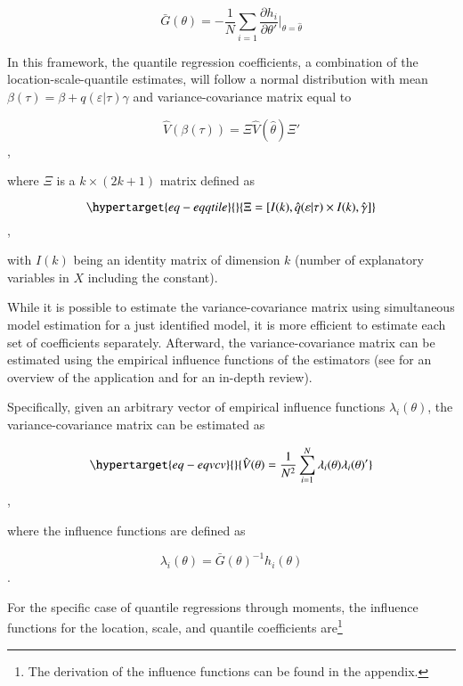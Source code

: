 \documentclass[
  authoryear,
  review,
  1p]{elsarticle}
\begin{document}
\[\bar{G}(\theta) =-\frac{1}{N} \sum_{i=1} \frac{\partial h_i}{\partial \theta'} \Big|_{\theta=\hat\theta}\]

In this framework, the quantile regression coefficients, a combination
of the location-scale-quantile estimates, will follow a normal
distribution with mean \(\beta(\tau) = \beta+q(\varepsilon|\tau)\gamma\)
and variance-covariance matrix equal to

\[\hat{V}(\beta(\tau)) = \Xi \hat{V}(\hat\theta) \Xi'
\],

where \(\Xi\) is a \(k \times (2k+1)\) matrix defined as

\begin{equation}\protect\hypertarget{eq-eqqtile}{}{\Xi = [ I(k), \hat q(\varepsilon|\tau) \times I(k), \hat \gamma ]
}\label{eq-eqqtile}\end{equation},

with \(I(k)\) being an identity matrix of dimension \(k\) (number of
explanatory variables in \(X\) including the constant).

While it is possible to estimate the variance-covariance matrix using
simultaneous model estimation for a just identified model, it is more
efficient to estimate each set of coefficients separately. Afterward,
the variance-covariance matrix can be estimated using the empirical
influence functions of the estimators (see \citet{jann_2020} for an
overview of the application and \citet{hampel2005} for an in-depth
review).

Specifically, given an arbitrary vector of empirical influence functions
\(\lambda_i(\theta)\), the variance-covariance matrix can be estimated
as

\begin{equation}\protect\hypertarget{eq-eqvcv}{}{\hat{V}(\theta) = \frac{1}{N^2} \sum_{i=1}^N \lambda_i(\theta) \lambda_i(\theta)'
}\label{eq-eqvcv}\end{equation},

where the influence functions are defined as

\[\lambda_i(\theta) = \bar G(\theta)^{-1} h_i(\theta)\].

For the specific case of quantile regressions through moments, the
influence functions for the location, scale, and quantile coefficients
are\footnote{The derivation of the influence functions can be found in
  the appendix.}
\end{document}
